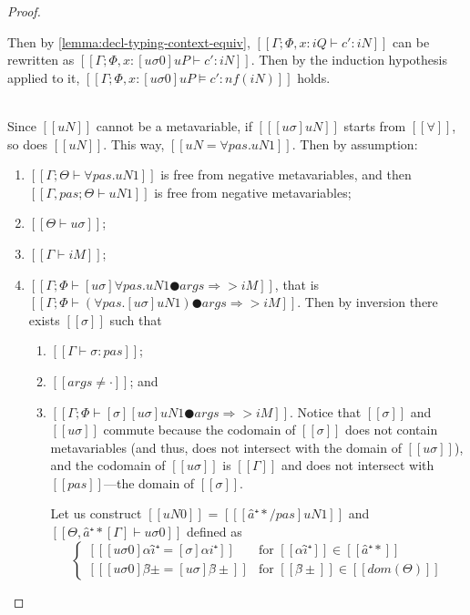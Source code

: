 \begin{proof}
\begin{caseof}
\begin{enumerate}
                    Then by \cref{lemma:decl-typing-context-equiv},
                    $[[Γ; Φ, x:iQ ⊢ c' : iN]]$ can be rewritten as
                    $[[Γ; Φ, x:[uσ0]uP ⊢ c' : iN]]$.
                    Then by the induction hypothesis applied to it, 
                    $[[Γ; Φ, x:[uσ0]uP ⊨ c' : nf(iN)]]$ holds.
            \end{enumerate}

        \item {}\\
            Since $[[uN]]$ cannot be a metavariable,  
            if $[[ [uσ]uN ]]$ starts from $[[∀]]$,
            so does $[[uN]]$. This way,
            $[[uN = ∀pas.uN1]]$.
            Then by assumption:
            \begin{enumerate}
                \item $[[Γ; Θ ⊢ ∀pas.uN1]]$ is free from negative metavariables, 
                    and then $[[Γ, pas; Θ ⊢ uN1]]$ is free from negative metavariables;
                \item $[[Θ ⊢ uσ]]$;
                \item $[[Γ ⊢ iM]]$;
                \item $[[Γ; Φ ⊢ [uσ]∀pas.uN1 ● args ⇒> iM]]$, 
                    \label{point:typing-completeness-forall-app-inversion}
                    that is $[[Γ; Φ ⊢ (∀pas.[uσ]uN1) ● args ⇒> iM]]$.
                    Then by inversion there exists $[[σ]]$ such that 
                    \begin{enumerate}
                        \item $[[Γ ⊢ σ : pas]]$;
                        \item $[[args ≠ ·]]$; and
                        \item $[[Γ ; Φ ⊢ [σ][uσ]uN1 ● args ⇒> iM]]$.
                            \label{point:typing-completeness-forall-app-inversion-2}
                            Notice that $[[σ]]$ and $[[uσ]]$ commute because 
                            the codomain of $[[σ]]$ does not contain
                            metavariables (and thus, does not intersect with 
                            the domain of $[[uσ]]$), and the codomain of $[[uσ]]$ is 
                            $[[Γ]]$ and does not intersect with $[[pas]]$---the domain of $[[σ]]$.

                            Let us construct $[[uN0]]$ = $[[ [â⁺*/pas]uN1 ]]$
                            and $[[Θ, â⁺*[Γ] ⊢ uσ0]]$ defined as
                            $$
                            \begin{cases}
                                [[ [uσ0]αî⁺ = [σ]αi⁺ ]] & \text{for $[[αî⁺]] \in  [[â⁺*]]$ }\\
                                [[ [uσ0]β̂± = [uσ]β̂± ]] & \text{for $[[β̂±]] \in [[dom(Θ)]]$}
                            \end{cases}
                            $$


\end{enumerate}
\end{enumerate}
\end{caseof}
\end{proof}
